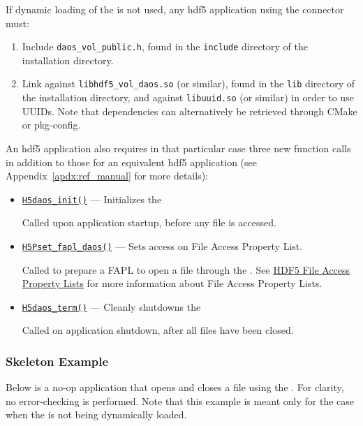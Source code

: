 \documentclass[../users_guide.tex]{subfiles}
\begin{document}
If dynamic loading of the \dvc{} is not used, any \acrshort{hdf5} application
using the connector must:
\begin{enumerate}
 \item Include \texttt{daos\_vol\_public.h}, found in the \texttt{include}
directory of the \dvc{} installation directory.
 \item Link against \texttt{libhdf5\_vol\_daos.so} (or similar), found in
the \texttt{lib} directory of the \dvc{} installation directory, and
against \texttt{libuuid.so} (or similar) in order to use UUIDs. Note that dependencies
can alternatively be retrieved through CMake or pkg-config.
\end{enumerate}

An \acrshort{hdf5} \dvc{} application also requires in that particular case three new
function calls in addition to those for an equivalent \acrshort{hdf5} application (see
Appendix~\ref{apdx:ref_manual} for more details):

\begin{itemize}
 \item \texttt{\hyperref[ref:h5daos_init]{H5daos\_init()}} --- Initializes the \dvc{}

    Called upon application startup, before any file is accessed.

 \item \texttt{\hyperref[ref:h5pset_fapl_daos]{H5Pset\_fapl\_daos()}} --- Sets \dvc{} access on File Access Property List.

    Called to prepare a FAPL to open a file through the \dvc{}. See \href{https://support.hdfgroup.org/HDF5/Tutor/property.html#fa}{HDF5 File Access Property Lists} for more information about File Access Property Lists.

 \item \texttt{\hyperref[ref:h5daos_term]{H5daos\_term()}} --- Cleanly shutdowns the \dvc{}

    Called on application shutdown, after all files have been closed.
\end{itemize}

\subsubsection{Skeleton Example}

Below is a no-op application that opens and closes a file using the \dvc{}.
For clarity, no error-checking is performed. Note that this example is
meant only for the case when the \dvc{} is not being dynamically loaded.
\end{document}
